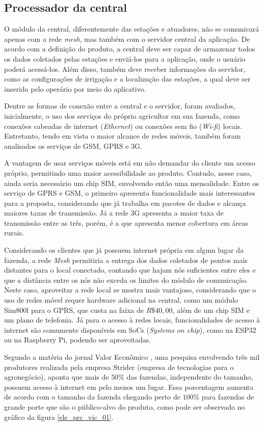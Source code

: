 \subsection{Processador da central}

O módulo da central, diferentemente das estações e atuadores, não se comunicará apenas com a rede \emph{mesh}, mas também com o servidor central da aplicação. De acordo com a definição do produto, a central deve ser capaz de armazenar todos os dados coletados pelas estações e enviá-los para a aplicação, onde o usuário poderá acessá-los. Além disso, também deve receber informações do servidor, como as configurações de irrigação e a localização das estações, a qual deve ser inserida pelo operário por meio do aplicativo.

Dentre as formas de conexão entre a central e o servidor, foram avaliados, inicialmente, o uso dos serviços do próprio agricultor em sua fazenda, como conexões cabeadas de internet (\emph{Ethernet}) ou conexões sem fio (\emph{Wi-fi}) locais. Entretanto, tendo em vista o maior alcance de redes móveis, também foram analisados os serviços de GSM, GPRS e 3G. 

A vantagem de usar serviços móveis está em não demandar do cliente um acesso próprio, permitindo uma maior acessibilidade ao produto. Contudo, nesse caso, ainda seria necessário um chip SIM, envolvendo então uma mensalidade. Entre os serviço de GPRS e GSM, o primeiro apresenta funcionalidade mais interessantes para a proposta, considerando que já trabalha em pacotes de dados e alcança maiores taxas de transmissão. Já a rede 3G apresenta a maior taxa de transmissão entre as três, porém, é a que apresenta menor cobertura em áreas rurais.

Considerando os clientes que já possuem internet própria em algum lugar da fazenda, a rede \emph{Mesh} permitiria a entrega dos dados coletados de pontos mais distantes para o local conectado, contando que hajam nós suficientes entre eles e que a distância entre os nós não exceda os limites do módulo de comunicação. Neste caso, aproveitar a rede local se mostra mais vantajoso, considerando que o uso de redes móvel requer hardware adicional na central, como um módulo Sim800l para o GPRS, que custa na faixa de $R\$40,00$, além de um chip SIM e um plano de telefonia. Já para o acesso à redes locais, funcionalidades de acesso à internet são comumente disponíveis em SoCs (\emph{Systems on chip}), como na ESP32 ou na Raspberry Pi, podendo ser aproveitadas.

Segundo a matéria do jornal Valor Econômico \cite{bib_proc_vic_02}, uma pesquisa envolvendo três mil produtores realizada pela empresa Strider (empresa de tecnologias para o agronegócio), aponta que mais de $50\%$ das fazendas, independente do tamanho, possuem acesso à internet em pelo menos um lugar. Essa porcentagem aumenta de acordo com o tamanho da fazenda chegando perto de $100\%$ para fazendas de grande porte que são o público-alvo do produto, como pode ser observado no gráfico da figura \ref{ele_prc_vic_01}.

